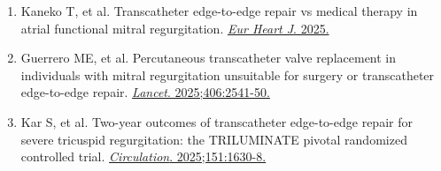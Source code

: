 \documentclass[12pt,a4paper]{article}
\begin{document}
\begin{enumerate}
    \item Kaneko T, et al. Transcatheter edge-to-edge repair vs medical therapy in atrial functional mitral regurgitation. \href{https://doi.org/10.1093/eurheartj/ehaf511}{\textit{Eur Heart J}. 2025.}

    \item Guerrero ME, et al. Percutaneous transcatheter valve replacement in individuals with mitral regurgitation unsuitable for surgery or transcatheter edge-to-edge repair. \href{https://doi.org/10.1016/S0140-6736(25)02073-2}{\textit{Lancet}. 2025;406:2541-50.}

    \item Kar S, et al. Two-year outcomes of transcatheter edge-to-edge repair for severe tricuspid regurgitation: the TRILUMINATE pivotal randomized controlled trial. \href{https://doi.org/10.1161/CIRCULATIONAHA.125.074536}{\textit{Circulation}. 2025;151:1630-8.}
\end{enumerate}
\end{document}
